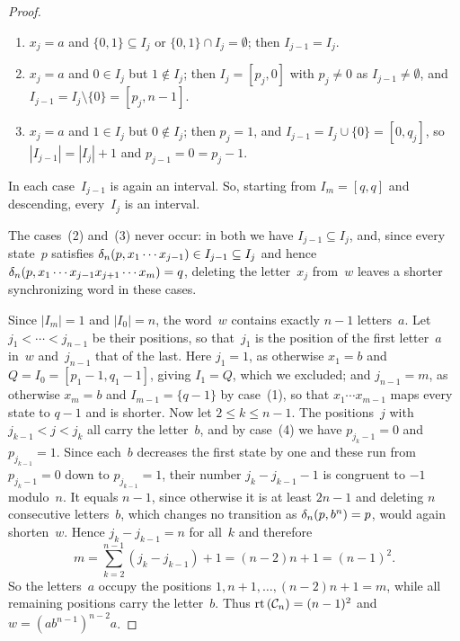 \begin{proof}
\begin{enumerate}
		\item $x_j = a$ and $\{0,1\} \subseteq I_j$ or $\{0,1\} \cap I_j = \emptyset$;
		then $I_{j-1} = I_j$.
		
		\item $x_j = a$ and $0 \in I_j$ but $1 \notin I_j$; then $I_j = [p_j,0]$
		with $p_j \ne 0$ as $I_{j-1} \ne \emptyset$, and
		$I_{j-1} = I_j \setminus \{0\} = [p_j,n-1]$.
		
		\item $x_j = a$ and $1 \in I_j$ but $0 \notin I_j$; then $p_j = 1$,
		and $I_{j-1} = I_j \cup \{0\} = [0,q_j]$, so $|I_{j-1}| = |I_j| + 1$
		and $p_{j-1} = 0 = p_j - 1$.
	\end{enumerate}
	In each case~$I_{j-1}$ is again an interval. So, starting from $I_m = [q,q]$ and
	descending, every~$I_j$ is an interval.
	
	The cases~(2) and~(3) never occur: in both we have $I_{j-1} \subseteq I_j$,
	and, since every state~$p$ satisfies
	$\delta_n(p,x_1 \cdots x_{j-1}) \in I_{j-1} \subseteq I_j$ and hence
	$\delta_n(p,x_1 \cdots x_{j-1}x_{j+1} \cdots x_m) = q$,
	deleting the letter~$x_j$ from~$w$ leaves a shorter synchronizing word
	in these cases.
	
	Since $|I_m| = 1$ and $|I_0| = n$, the word~$w$ contains exactly $n-1$ letters~$a$.
	Let $j_1 < \cdots < j_{n-1}$ be their positions, so that~$j_1$ is the position of the
	first letter~$a$ in~$w$ and~$j_{n-1}$ that of the last.
	Here $j_1 = 1$, as otherwise $x_1 = b$ and $Q = I_0 = [p_1 - 1, q_1 - 1]$,
	giving $I_1 = Q$, which we excluded;
	and $j_{n-1} = m$, as otherwise $x_m = b$ and $I_{m-1} = \{q-1\}$ by case~(1),
	so that $x_1 \cdots x_{m-1}$ maps every state to $q-1$ and is shorter.
	Now let $2 \le k \le n-1$. The positions~$j$ with $j_{k-1} < j < j_k$ all carry the
	letter~$b$, and by case~(4) we have $p_{j_k - 1} = 0$ and $p_{j_{k-1}} = 1$.
	Since each~$b$ decreases the first state by one and these run from
	$p_{j_k - 1} = 0$ down to $p_{j_{k-1}} = 1$, their number
	$j_k - j_{k-1} - 1$ is congruent to $-1$ modulo~$n$.
	It equals $n-1$, since otherwise it is at least $2n-1$ and deleting $n$ consecutive
	letters~$b$, which changes no transition as $\delta_n(p,b^n) = p$,
	would again shorten~$w$. Hence $j_k - j_{k-1} = n$ for all~$k$ and therefore
	\[
	m = \sum_{k=2}^{n-1} (j_k - j_{k-1}) + 1 = (n-2)n + 1 = (n-1)^2 .
	\]
	So the letters~$a$ occupy the positions $1, n+1, \ldots, (n-2)n + 1 = m$, while all
	remaining positions carry the letter~$b$.
	Thus $\operatorname{rt}{(\mathcal C_n)} = (n-1)^2$ and $w = (ab^{n-1})^{n-2}a$.
\end{proof}

